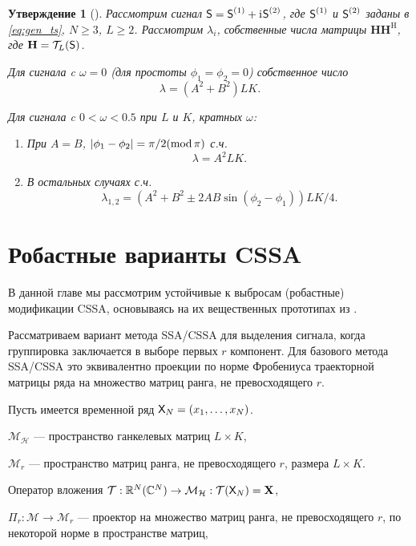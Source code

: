 \documentclass[specialist,
               substylefile = spbu.rtx,
               subf,href,colorlinks=true, 12pt]{disser}
\newtheorem{statement}{Утверждение}
\begin{document}
\begin{statement} [\cite{Golyandina.Stepanov2005}]\label{st:singular_values}
	Рассмотрим сигнал $\textsf{S} = \textsf{S}^{(1)} + \mathrm{i}\mkern1mu \textsf{S}^{(2)}$, где $\textsf{S}^{(1)}$ и $\textsf{S}^{(2)}$ заданы в \eqref{eq:gen_ts}, $N\ge 3$, $L\ge 2$. Рассмотрим $\lambda_i$, собственные числа матрицы $\mathbf{H}\mathbf{H}^\mathrm{H}$, где $\mathbf{H} = \mathcal{T}_L(\textsf{S})$.
	
	Для сигнала c $\omega = 0$ (для простоты $\phi_1=\phi_2=0$) собственное число $$\lambda = (A^2 + B^2) L K.$$
	
	Для сигнала c $0< \omega < 0.5$ при $L$ и $K$, кратных $\omega$:
	\begin{enumerate}
		\item При $A = B$, $|\phi_1 - \phi_2| = \pi / 2(\mathop{\mathrm{mod}} \pi)$ с.ч. $$\lambda = A^2 L K.$$
		\item В остальных случаях с.ч. $$\lambda_{1,2} = (A^2 + B^2 \pm 2 A B \sin(\phi_2 - \phi_1)) L K / 4.$$
	\end{enumerate}
\end{statement}


\chapter{Робастные варианты CSSA}
\label{ch:ssa_outliers}
В данной главе мы рассмотрим устойчивые к выбросам (робастные) модификации CSSA, основываясь на их вещественных прототипах из \cite{Tretyakova20}.


Рассматриваем вариант метода SSA/CSSA для выделения сигнала, когда группировка заключается в выборе первых $r$ компонент. Для базового метода SSA/CSSA это эквивалентно проекции по норме Фробениуса траекторной матрицы ряда на множество матриц ранга, не превосходящего $r$.

Пусть имеется временной ряд $\textsf{X}_N=(x_1, \ldots, x_{N})$.

$\mathcal{M}_{\mathcal{H}}$ --- пространство ганкелевых матриц $L\times K$,

$\mathcal{M}_{r}$ --- пространство матриц ранга, не превосходящего $r$, размера $L \times K$.

Оператор вложения $\mathcal{T}:\mathbb{R}^N(\mathbb{C}^N) \rightarrow \mathcal{M}_{\mathcal{H}}: \mathcal{T} (\textsf{X}_N) = \mathbf{X} $,

$\Pi_{r}:\mathcal{M}\rightarrow \mathcal{M}_r$ --- проектор на множество матриц ранга, не превосходящего $r$, по некоторой норме в пространстве матриц,
\end{document}

